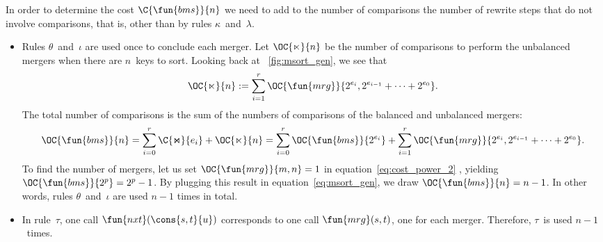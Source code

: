 In order to determine the cost
\(\C{\fun{bms}}{n}\) we need to add to
the number of comparisons the number of rewrite steps that do not
involve comparisons, that is, other than by rules
\(\kappa\)~and~\(\lambda\).
\begin{itemize}

  \item Rules \(\theta\)~and~\(\iota\) are used once to conclude each
  merger. Let \(\OC{\ltimes}{n}\) be the
  number of comparisons to perform the unbalanced mergers when there
  are \(n\)~keys to sort. Looking back at \fig~\vref{fig:msort_gen},
  we see that
    \begin{equation}
      \OC{\ltimes}{n} :=
      \sum_{i=1}^{r}{\OC{\fun{mrg}}{2^{e_i},2^{e_{i-1}}+\dots+2^{e_0}}}.
      \label{eq:C_unbal}
    \end{equation}
    The total number of comparisons is the sum of the numbers of
    comparisons of the balanced and unbalanced mergers:
    \begin{equation}
      \OC{\fun{bms}}{n}
      = \sum_{i=0}^{r}{\C{\Join}{e_i}}
      +
      \OC{\ltimes}{n}
      = \sum_{i=0}^{r}{\OC{\fun{bms}}{2^{e_i}}}
      +
      \sum_{i=1}^{r}{\OC{\fun{mrg}}{2^{e_i},2^{e_{i-1}}+\dots+2^{e_0}}}.
      \label{eq:msort_gen}
    \end{equation}
    To find the number of mergers, let us set \(\OC{\fun{mrg}}{m,n} =
    1\) in equation~\eqref{eq:cost_power_2}
    , yielding \(\OC{\fun{bms}}{2^p} = 2^p -
    1\). By plugging this result in equation~\eqref{eq:msort_gen}, we
    draw \(\OC{\fun{bms}}{n} = n - 1\). In other words, rules
    \(\theta\)~and~\(\iota\) are used \(n-1\)\label{eq:bms_merges}
    times in total.

  \item In rule~\(\tau\), one call
    \(\fun{nxt}(\cons{s,t}{u})\) corresponds to
    one call \(\fun{mrg}(s,t)\), one for each
    merger. Therefore, \(\tau\)~is used \(n-1\)~times.


\end{itemize}

